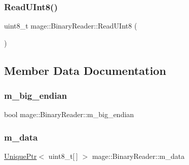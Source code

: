 \hypertarget{classmage_1_1_binary_reader_af0378b53d82b20ec703e09b325d7a5d2}{}\label{classmage_1_1_binary_reader_af0378b53d82b20ec703e09b325d7a5d2} 
\subsubsection{\texorpdfstring{Read\+U\+Int8()}{ReadUInt8()}}
{\footnotesize\ttfamily uint8\+\_\+t mage\+::\+Binary\+Reader\+::\+Read\+U\+Int8 (\begin{DoxyParamCaption}{ }\end{DoxyParamCaption})\hspace{0.3cm}{\ttfamily [protected]}}



\subsection{Member Data Documentation}
\hypertarget{classmage_1_1_binary_reader_a8d23fde958e08efe248edb5d92861113}{}\label{classmage_1_1_binary_reader_a8d23fde958e08efe248edb5d92861113} 
\subsubsection{\texorpdfstring{m\+\_\+big\+\_\+endian}{m\_big\_endian}}
{\footnotesize\ttfamily bool mage\+::\+Binary\+Reader\+::m\+\_\+big\+\_\+endian\hspace{0.3cm}{\ttfamily [private]}}

\hypertarget{classmage_1_1_binary_reader_a34820a214a5b98e09beb12e8a465b0e3}{}\label{classmage_1_1_binary_reader_a34820a214a5b98e09beb12e8a465b0e3} 
\subsubsection{\texorpdfstring{m\+\_\+data}{m\_data}}
{\footnotesize\ttfamily \hyperlink{namespacemage_a8c307fbcc33bce9b7f2aa4c26c3b95cf}{Unique\+Ptr}$<$ uint8\+\_\+t\mbox{[}$\,$\mbox{]} $>$ mage\+::\+Binary\+Reader\+::m\+\_\+data\hspace{0.3cm}{\ttfamily [private]}}

